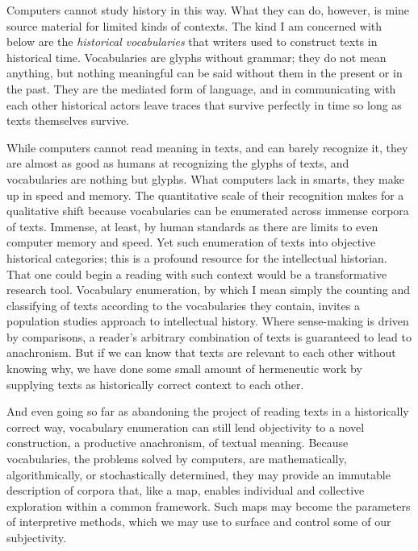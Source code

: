 \documentclass[]{book}
\begin{document}
Computers cannot study history in this way. What they can do, however,
is mine source material for limited kinds of contexts. The kind I am
concerned with below are the \emph{historical vocabularies} that writers
used to construct texts in historical time. Vocabularies are glyphs
without grammar; they do not mean anything, but nothing meaningful can
be said without them in the present or in the past. They are the
mediated form of language, and in communicating with each other
historical actors leave traces that survive perfectly in time so long as
texts themselves survive.

While computers cannot read meaning in texts, and can barely recognize
it, they are almost as good as humans at recognizing the glyphs of
texts, and vocabularies are nothing but glyphs. What computers lack in
smarts, they make up in speed and memory. The quantitative scale of
their recognition makes for a qualitative shift because vocabularies can
be enumerated across immense corpora of texts. Immense, at least, by
human standards as there are limits to even computer memory and speed.
Yet such enumeration of texts into objective historical categories; this
is a profound resource for the intellectual historian. That one could
begin a reading with such context would be a transformative research
tool. Vocabulary enumeration, by which I mean simply the counting and
classifying of texts according to the vocabularies they contain, invites
a population studies approach to intellectual history. Where
sense-making is driven by comparisons, a reader's arbitrary combination
of texts is guaranteed to lead to anachronism. But if we can know that
texts are relevant to each other without knowing why, we have done some
small amount of hermeneutic work by supplying texts as historically
correct context to each other.

And even going so far as abandoning the project of reading texts in a
historically correct way, vocabulary enumeration can still lend
objectivity to a novel construction, a productive anachronism, of
textual meaning. Because vocabularies, the problems solved by computers,
are mathematically, algorithmically, or stochastically determined, they
may provide an immutable description of corpora that, like a map,
enables individual and collective exploration within a common framework.
Such maps may become the parameters of interpretive methods, which we
may use to surface and control some of our subjectivity.
\end{document}
